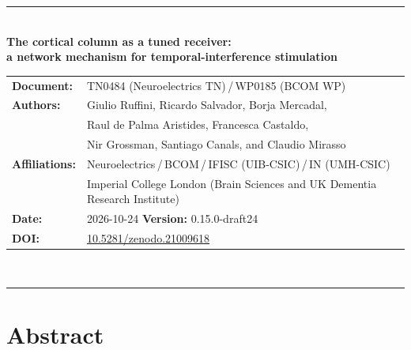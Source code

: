 \documentclass[11pt,a4paper]{article}
\newif\ifsupp
\newcommand{\paperver}{0.15.0-draft24} %
\begin{document}
\vspace{6pt}
\else
\begin{flushleft}
{\color{neblue}\rule{\textwidth}{2pt}}\\[4pt]
{\LARGE\bfseries The cortical column as a tuned receiver:\\[2pt]
a network mechanism for temporal-interference stimulation}\\[10pt]
\begin{tabular}{@{}ll@{}}
\textbf{Document:} & TN0484 (Neuroelectrics TN)\,/\,WP0185 (BCOM WP) \\
\textbf{Authors:} & Giulio Ruffini, Ricardo Salvador, Borja Mercadal,\\
& Raul de Palma Aristides, Francesca Castaldo,\\
& Nir Grossman, Santiago Canals, and Claudio Mirasso \\
\textbf{Affiliations:} & Neuroelectrics\,/\,BCOM\,/\,IFISC (UIB-CSIC)\,/\,IN (UMH-CSIC)\\
& Imperial College London (Brain Sciences and UK Dementia Research Institute) \\
\textbf{Date:} & 2026-10-24 \qquad \textbf{Version:} \paperver \\
\textbf{DOI:} & \href{https://doi.org/10.5281/zenodo.21009618}{10.5281/zenodo.21009618} \\
\end{tabular}\\[4pt]
{\color{neblue}\rule{\textwidth}{1pt}}
\end{flushleft}
\fi

\ifsupp
\begin{center}
{\large\bfseries Supplementary Material}\\[4pt]
\begin{minipage}{0.86\textwidth}\centering\small
Additional methods, derivations, and figures accompanying the article. Sections, equations, and figures use S-prefixed numbers;
references to article equations are marked as main-text references.
\end{minipage}
\end{center}
\vspace{8pt}
\fi

\ifsupp\else
\section*{Abstract}
\end{document}
